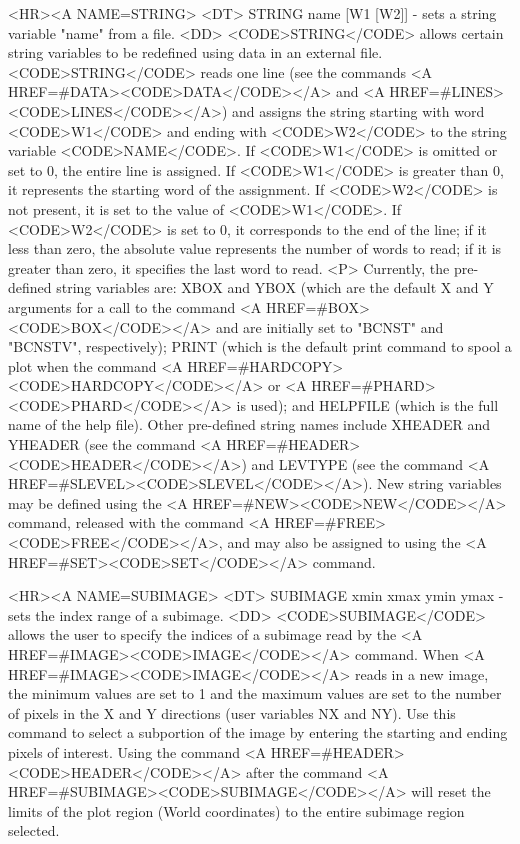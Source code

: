 \begin{rawhtml}
<HR><A NAME=STRING>
<DT>
STRING name [W1 [W2]] - sets a string variable "name" from a file.
<DD>
	<CODE>STRING</CODE> allows certain string variables to be
	redefined using data in an external file.  <CODE>STRING</CODE>
	reads one line (see the commands <A HREF=#DATA><CODE>DATA</CODE></A>
	and <A HREF=#LINES><CODE>LINES</CODE></A>) and assigns the string
	starting with word <CODE>W1</CODE> and ending with <CODE>W2</CODE>
	to the string variable <CODE>NAME</CODE>.  If <CODE>W1</CODE> is
	omitted or set to 0, the entire line is assigned.  If <CODE>W1</CODE>
	is greater than 0, it represents the starting word of the
	assignment.  If <CODE>W2</CODE> is not present, it is set to the
	value of <CODE>W1</CODE>.  If <CODE>W2</CODE> is set to 0, it
	corresponds to the end of the line; if it less than zero, the
	absolute value represents the number of words to read; if it
	is greater than zero, it specifies the last word to read.
	<P>
	Currently, the pre-defined string variables are: XBOX and YBOX
	(which are the default X and Y arguments for a call to the
	command <A HREF=#BOX><CODE>BOX</CODE></A> and are initially
	set to "BCNST" and "BCNSTV", respectively); PRINT (which is
	the default print command to spool a plot when the command
	<A HREF=#HARDCOPY><CODE>HARDCOPY</CODE></A> or
	<A HREF=#PHARD><CODE>PHARD</CODE></A> is used); and
	HELPFILE (which is the full name of the help file).  Other
	pre-defined string names include XHEADER and YHEADER (see
	the command <A HREF=#HEADER><CODE>HEADER</CODE></A>) and LEVTYPE
	(see the command <A HREF=#SLEVEL><CODE>SLEVEL</CODE></A>).  New
	string variables may be defined using the
	<A HREF=#NEW><CODE>NEW</CODE></A> command, released with the
	command <A HREF=#FREE><CODE>FREE</CODE></A>, and may also be
	assigned to using the <A HREF=#SET><CODE>SET</CODE></A> command.

<HR><A NAME=SUBIMAGE>
<DT>
SUBIMAGE xmin xmax ymin ymax - sets the index range of a subimage.
<DD>
	<CODE>SUBIMAGE</CODE> allows the user to specify the indices
	of a subimage read by the <A HREF=#IMAGE><CODE>IMAGE</CODE></A>
	command.  When <A HREF=#IMAGE><CODE>IMAGE</CODE></A> reads in
	a new image, the minimum values are set to 1 and the maximum
	values are set to the number of pixels in the X and Y directions
	(user variables NX and NY).  Use this command to select a subportion
	of the image by entering the starting and ending pixels of
	interest.  Using the command <A HREF=#HEADER><CODE>HEADER</CODE></A>
	after the command <A HREF=#SUBIMAGE><CODE>SUBIMAGE</CODE></A> will
	reset the limits of the plot region (World coordinates) to the
	entire subimage region selected.


\end{rawhtml}

